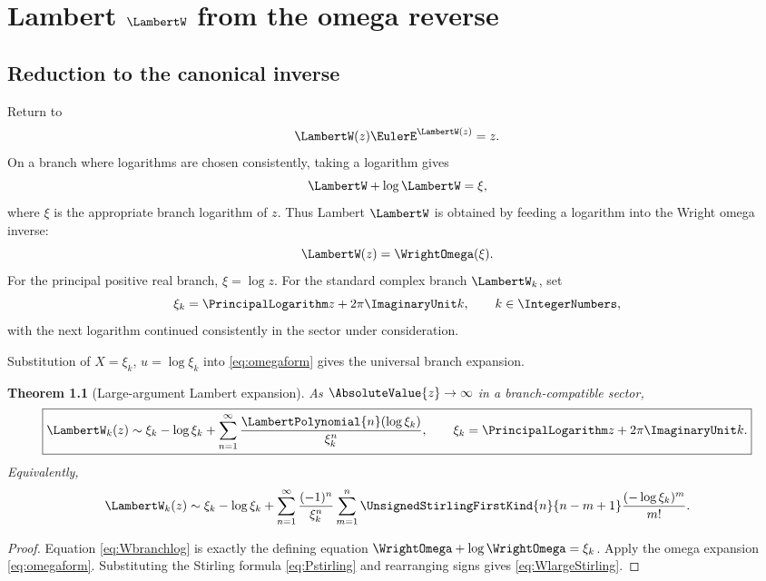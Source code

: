 \documentclass[11pt,oneside,openany]{book}
\newtheorem{theorem}{Theorem}[chapter]
\begin{document}
\chapter{Lambert \texorpdfstring{\(\LambertW\)}{W} from the omega reverse}
\label{ch:lambert}

\section{Reduction to the canonical inverse}
Return to
\[
 \LambertW(z)\EulerE^{\LambertW(z)}=z.
\]
On a branch where logarithms are chosen consistently, taking a logarithm gives
\begin{equation}\label{eq:Wbranchlog}
 \LambertW+\log \LambertW=\xi,
\end{equation}
where \(\xi\) is the appropriate branch logarithm of \(z\).  Thus Lambert
\(\LambertW\) is obtained by feeding a logarithm into the Wright omega inverse:
\begin{equation}\label{eq:Womega}
 \LambertW(z)=\WrightOmega(\xi).
\end{equation}
For the principal positive real branch, \(\xi=\log z\).  For the standard
complex branch \(\LambertW_k\), set
\begin{equation}\label{eq:xik}
 \xi_k=\PrincipalLogarithm z+2\pi\ImaginaryUnit k,
 \qquad k\in\IntegerNumbers,
\end{equation}
with the next logarithm continued consistently in the sector under
consideration.

Substitution of \(X=\xi_k\), \(u=\log\xi_k\) into
\cref{eq:omegaform} gives the universal branch expansion.

\begin{theorem}[Large-argument Lambert expansion]\label{thm:Wlarge}
As \(\AbsoluteValue{z}\to\infty\) in a branch-compatible sector,
\begin{equation}\label{eq:WlargePn}
 \boxed{
 \LambertW_k(z)\sim
 \xi_k-\log\xi_k+
 \sum_{n=1}^{\infty}
 \frac{\LambertPolynomial{n}(\log\xi_k)}{\xi_k^n},
 \qquad
 \xi_k=\PrincipalLogarithm z+2\pi\ImaginaryUnit k.
 }
\end{equation}
Equivalently,
\begin{equation}\label{eq:WlargeStirling}
 \LambertW_k(z)\sim\xi_k-\log\xi_k+
 \sum_{n=1}^{\infty}\frac{(-1)^n}{\xi_k^n}
 \sum_{m=1}^{n}
 \UnsignedStirlingFirstKind{n}{n-m+1}
 \frac{(-\log\xi_k)^m}{m!}.
\end{equation}
\end{theorem}

\begin{proof}
Equation \cref{eq:Wbranchlog} is exactly the defining equation
\(\WrightOmega+\log\WrightOmega=\xi_k\).  Apply the omega expansion
\cref{eq:omegaform}.  Substituting the Stirling formula
\cref{eq:Pstirling} and rearranging signs gives
\cref{eq:WlargeStirling}.
\end{proof}
\end{document}
